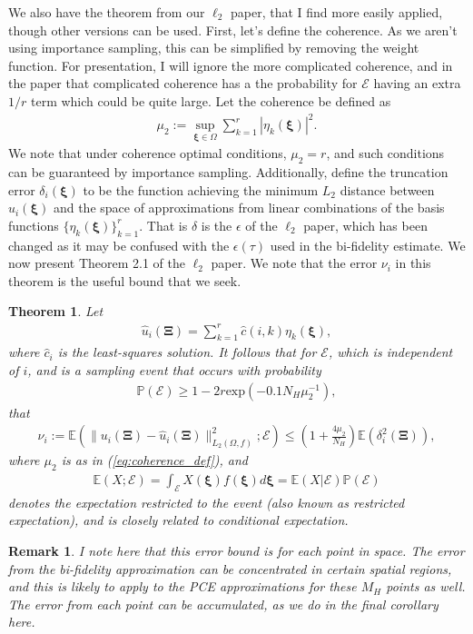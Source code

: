 \documentclass{report}
\newtheorem{thm}{Theorem}[section]
\newtheorem{remark}{Remark}[section]
\begin{document}
We also have the theorem from our $\ell_2$ paper, that I find more easily applied, though other versions can be used. First, let's define the coherence. As we aren't using importance sampling, this can be simplified by removing the weight function. For presentation, I will ignore the more complicated coherence, and in the paper that complicated coherence has a the probability for $\mathcal{E}$ having an extra $1/r$ term which could be quite large. Let the coherence be defined as
\begin{align}
\label{eq:coherence_def}
 \mu_2 := \mathop{\sup}\limits_{\bm{\xi}\in\Omega}\mathop{\sum}\limits_{k=1}^{r}|\eta_k(\bm{\xi})|^2.
\end{align}
We note that under coherence optimal conditions, $\mu_2=r$, and such conditions can be guaranteed by importance sampling. Additionally, define the truncation error $\delta_i(\bm{\xi})$ to be the function achieving the minimum $L_2$ distance between $u_i(\bm{\xi})$ and the space of approximations from linear combinations of the basis functions $\{\eta_k(\bm{\xi})\}_{k=1}^{r}$. That is $\delta$ is the $\epsilon$ of the $\ell_2$ paper, which has been changed as it may be confused with the $\epsilon(\tau)$ used in the bi-fidelity estimate. We now present Theorem 2.1 of the $\ell_2$ paper. We note that the error $\nu_i$ in this theorem is the useful bound that we seek.
\begin{thm}
\label{thm:ez_pce}
Let
\begin{align}
\hat{u}_i(\bm{\Xi}) = \mathop{\sum}\limits_{k=1}^r \hat{c}(i,k)\eta_k(\bm{\xi}),
\end{align}
where $\hat{c}_i$ is the least-squares solution. It follows that for $\mathcal{E}$, which is independent of $i$, and is a sampling event that occurs with probability
\begin{align}
\label{eqn:rare_prob}
\mathbb{P}(\mathcal{E}) \ge 1-2r\mbox{exp}(-0.1N_H\mu_2^{-1}),
\end{align}
that
\begin{align}
\label{eq:small_nu_bd}
 \nu_i := \mathbb{E}\left(\|u_i(\bm{\Xi})-\hat{u}_i(\bm{\Xi})\|^2_{L_2(\Omega,f)};\mathcal{E}\right) \le \left(1+\frac{4\mu_2}{N_H}\right)\mathbb{E}(\delta^2_i(\bm{\Xi})),
\end{align}
where $\mu_2$ is as in (\ref{eq:coherence_def}), and
\begin{align}
 \mathbb{E}\left(X;\mathcal{E}\right) = \int_{\mathcal{E}}X(\bm{\xi})f(\bm{\xi})d\bm{\xi} = \mathbb{E}(X|\mathcal{E})\mathbb{P}(\mathcal{E})
\end{align}
denotes the expectation restricted to the event (also known as restricted expectation), and is closely related to conditional expectation.
\end{thm}
\begin{remark}
 I note here that this error bound is for each point in space. The error from the bi-fidelity approximation can be concentrated in certain spatial regions, and this is likely to apply to the PCE approximations for these $M_H$ points as well. The error from each point can be accumulated, as we do in the final corollary here.
\end{remark}
\end{document}
